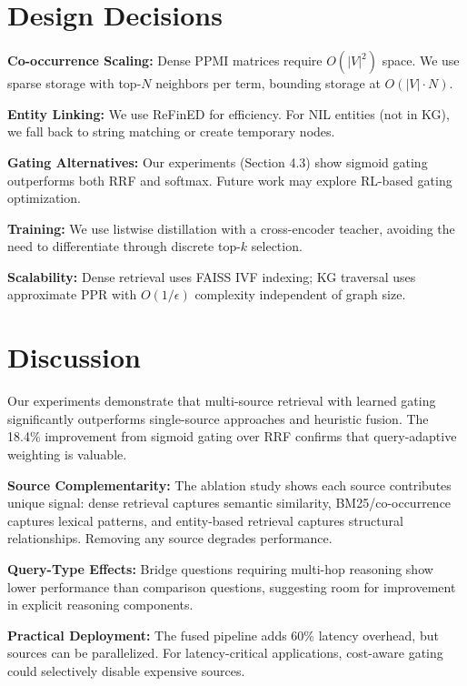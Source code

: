 \documentclass[11pt,a4paper]{article}
\begin{document}
\section{Design Decisions}
\label{sec:design_decisions}

\textbf{Co-occurrence Scaling:} Dense PPMI matrices require $O(|V|^2)$ space. We use sparse storage with top-$N$ neighbors per term, bounding storage at $O(|V| \cdot N)$.

\textbf{Entity Linking:} We use ReFinED \citep{ayoola2022refined} for efficiency. For NIL entities (not in KG), we fall back to string matching or create temporary nodes.

\textbf{Gating Alternatives:} Our experiments (Section 4.3) show sigmoid gating outperforms both RRF and softmax. Future work may explore RL-based gating optimization.

\textbf{Training:} We use listwise distillation with a cross-encoder teacher, avoiding the need to differentiate through discrete top-$k$ selection.

\textbf{Scalability:} Dense retrieval uses FAISS IVF indexing; KG traversal uses approximate PPR with $O(1/\epsilon)$ complexity independent of graph size.

\section{Discussion}
\label{sec:discussion}

Our experiments demonstrate that multi-source retrieval with learned gating significantly outperforms single-source approaches and heuristic fusion. The 18.4\% improvement from sigmoid gating over RRF confirms that query-adaptive weighting is valuable.

\textbf{Source Complementarity:} The ablation study shows each source contributes unique signal: dense retrieval captures semantic similarity, BM25/co-occurrence captures lexical patterns, and entity-based retrieval captures structural relationships. Removing any source degrades performance.

\textbf{Query-Type Effects:} Bridge questions requiring multi-hop reasoning show lower performance than comparison questions, suggesting room for improvement in explicit reasoning components.

\textbf{Practical Deployment:} The fused pipeline adds 60\% latency overhead, but sources can be parallelized. For latency-critical applications, cost-aware gating could selectively disable expensive sources.
\end{document}

